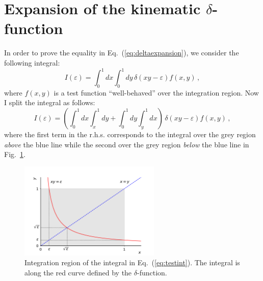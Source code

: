 \documentclass[10pt,a4paper]{article}
\begin{document}
\section{Expansion of the kinematic $\delta$-function}\label{sec:deltaexpansion}

In order to prove the equality in Eq.~(\ref{eq:deltaexpansion}), we
consider the following integral:
\begin{equation}\label{eq:testint}
I(\varepsilon) =\int_0^1 dx \int_0^1 dy\,\delta(xy-\varepsilon) f(x,y)\,,
\end{equation}
where $f(x,y)$ is a test function ``well-behaved'' over the
integration region. Now I split the integral as follows:
\begin{equation}
I(\varepsilon) =\left(\int_0^1 dx \int_x^1 dy+\int_0^1 dy \int_y^1 dx\right)\,\delta(xy-\varepsilon) f(x,y)\,,
\end{equation}
where the first term in the r.h.s. corresponds to the integral over
the grey region \textit{above} the blue line while the second over the
grey region \textit{below} the blue line in
Fig.~\ref{fig:deltaexpansion}.
\begin{figure}[t]
  \begin{centering}
    \includegraphics[width=0.6\textwidth]{../plots/DeltaExpansion}
    \caption{Integration region of the integral in 
      Eq.~(\ref{eq:testint}). The integral is along the red curve 
      defined by the $\delta$-function.\label{fig:deltaexpansion}}
  \end{centering}
\end{figure}
\end{document}
